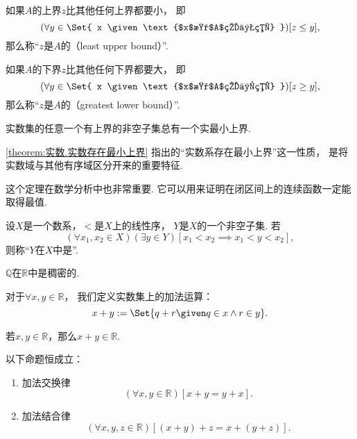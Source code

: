 如果\(A\)的上界\(z\)比其他任何上界都要小，
即\[
	(\forall y \in \Set{ x \given \text{$x$是$A$的上界} })
	[z \leq y],
\]
那么称“\(z\)是\(A\)的（least upper bound）”.

如果\(A\)的下界\(z\)比其他任何下界都要大，
即\[
	(\forall y \in \Set{ x \given \text{$x$是$A$的下界} })
	[z \geq y],
\]
那么称“\(z\)是\(A\)的（greatest lower bound）”.

\begin{theorem}\label{theorem:实数.实数存在最小上界}
实数集的任意一个有上界的非空子集总有一个实最小上界.
\end{theorem}
\cref{theorem:实数.实数存在最小上界}
指出的“实数系存在最小上界”这一性质，
是将实数域与其他有序域区分开来的重要特征.

这个定理在数学分析中也非常重要.
它可以用来证明在闭区间上的连续函数一定能取得最值.

\begin{definition}
设\(X\)是一个数系，\(<\)是\(X\)上的线性序，
\(Y\)是\(X\)的一个非空子集.
若\[
	(\forall x_1,x_2 \in X)
	(\exists y \in Y)
	[x_1 < x_2 \implies x_1 < y < x_2],
\]
则称“\(Y\)在\(X\)中是”.
\end{definition}

\begin{proposition}
\(\mathbb{Q}\)在\(\mathbb{R}\)中是稠密的.
\end{proposition}

\begin{definition}
对于\(\forall x,y\in\mathbb{R}\)，
我们定义实数集上的加法运算：
\begin{equation}
	x + y \defeq \Set{
		q + r \given q \in x \land r \in y
	}.
\end{equation}
\end{definition}

\begin{lemma}
若\(x,y\in\mathbb{R}\)，那么\(x+y\in\mathbb{R}\).
\end{lemma}

\begin{theorem}
以下命题恒成立：
\begin{enumerate}
	\item 加法交换律
	\begin{equation}
		(\forall x,y\in\mathbb{R})[x+y=y+x].
	\end{equation}
	\item 加法结合律
	\begin{equation}
		(\forall x,y,z\in\mathbb{R})[(x+y)+z=x+(y+z)].
	\end{equation}
\end{enumerate}
\end{theorem}

